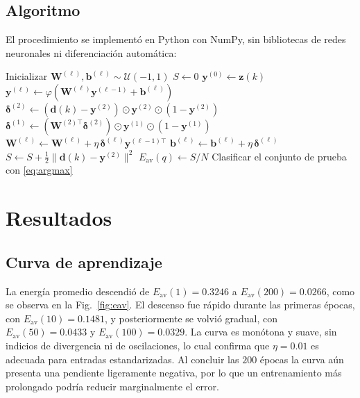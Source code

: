 \documentclass[conference]{IEEEtran}
\begin{document}
\subsection{Algoritmo}
El procedimiento se implementó en Python con NumPy, sin bibliotecas de redes
neuronales ni diferenciación automática:
\begin{algorithmic}[1]
\STATE Inicializar $\mathbf{W}^{(\ell)},\mathbf{b}^{(\ell)}\sim\mathcal{U}(-1,1)$
    \STATE $S\leftarrow0$
        \STATE $\mathbf{y}^{(0)}\leftarrow\mathbf{z}(k)$
            \STATE $\mathbf{y}^{(\ell)}\leftarrow\varphi(\mathbf{W}^{(\ell)}\mathbf{y}^{(\ell-1)}+\mathbf{b}^{(\ell)})$
        \ENDFOR
        \STATE $\boldsymbol{\delta}^{(2)}\leftarrow(\mathbf{d}(k)-\mathbf{y}^{(2)})\odot\mathbf{y}^{(2)}\odot(1-\mathbf{y}^{(2)})$
        \STATE $\boldsymbol{\delta}^{(1)}\leftarrow(\mathbf{W}^{(2)\top}\boldsymbol{\delta}^{(2)})\odot\mathbf{y}^{(1)}\odot(1-\mathbf{y}^{(1)})$
            \STATE $\mathbf{W}^{(\ell)}\leftarrow\mathbf{W}^{(\ell)}+\eta\,\boldsymbol{\delta}^{(\ell)}\mathbf{y}^{(\ell-1)\top}$
            \STATE $\mathbf{b}^{(\ell)}\leftarrow\mathbf{b}^{(\ell)}+\eta\,\boldsymbol{\delta}^{(\ell)}$
        \ENDFOR
        \STATE $S\leftarrow S+\tfrac{1}{2}\|\mathbf{d}(k)-\mathbf{y}^{(2)}\|^2$
    \ENDFOR
    \STATE $E_{\text{av}}(q)\leftarrow S/N$
\ENDFOR
\STATE Clasificar el conjunto de prueba con \eqref{eq:argmax}
\end{algorithmic}

\section{Resultados}

\subsection{Curva de aprendizaje}
La energía promedio descendió de $E_{\text{av}}(1)=0.3246$ a
$E_{\text{av}}(200)=0.0266$, como se observa en la Fig.~\ref{fig:eav}. El
descenso fue rápido durante las primeras épocas, con
$E_{\text{av}}(10)=0.1481$, y posteriormente se volvió gradual, con
$E_{\text{av}}(50)=0.0433$ y $E_{\text{av}}(100)=0.0329$. La curva es
monótona y suave, sin indicios de divergencia ni de oscilaciones, lo cual
confirma que $\eta=0.01$ es adecuada para entradas estandarizadas. Al
concluir las $200$ épocas la curva aún presenta una pendiente ligeramente
negativa, por lo que un entrenamiento más prolongado podría reducir
marginalmente el error.
\end{document}

